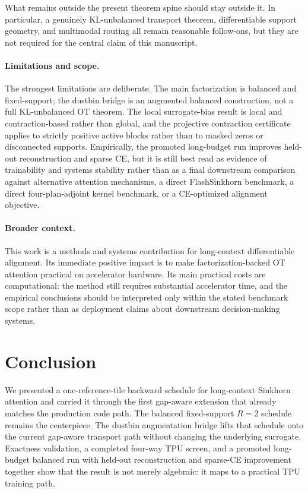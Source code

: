 \documentclass{article}
\begin{document}
What remains outside the present theorem spine should stay outside it. In particular, a genuinely KL-unbalanced transport theorem, differentiable support geometry, and multimodal routing all remain reasonable follow-ons, but they are not required for the central claim of this manuscript.

\paragraph{Limitations and scope.}
The strongest limitations are deliberate. The main factorization is balanced and fixed-support; the dustbin bridge is an augmented balanced construction, not a full KL-unbalanced OT theorem. The local surrogate-bias result is local and contraction-based rather than global, and the projective contraction certificate applies to strictly positive active blocks rather than to masked zeros or disconnected supports. Empirically, the promoted long-budget run improves held-out reconstruction and sparse CE, but it is still best read as evidence of trainability and systems stability rather than as a final downstream comparison against alternative attention mechanisms, a direct FlashSinkhorn benchmark, a direct four-plan-adjoint kernel benchmark, or a CE-optimized alignment objective.

\paragraph{Broader context.}
This work is a methods and systems contribution for long-context differentiable alignment. Its immediate positive impact is to make factorization-backed OT attention practical on accelerator hardware. Its main practical costs are computational: the method still requires substantial accelerator time, and the empirical conclusions should be interpreted only within the stated benchmark scope rather than as deployment claims about downstream decision-making systems.

\section{Conclusion}

We presented a one-reference-tile backward schedule for long-context Sinkhorn attention and carried it through the first gap-aware extension that already matches the production code path. The balanced fixed-support $R=2$ schedule remains the centerpiece. The dustbin augmentation bridge lifts that schedule onto the current gap-aware transport path without changing the underlying surrogate. Exactness validation, a completed four-way TPU screen, and a promoted long-budget balanced run with held-out reconstruction and sparse-CE improvement together show that the result is not merely algebraic: it maps to a practical TPU training path.
\end{document}
